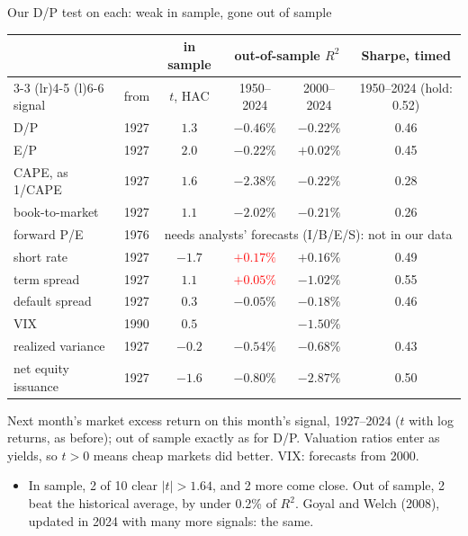 \documentclass[aspectratio=169,10pt]{beamer}
\begin{document}
\begin{frame}{Our D/P test on each: weak in sample, gone out of sample}
\begin{center}
\footnotesize
\renewcommand{\arraystretch}{1.0}
\begin{tabular}{@{}llcccc@{}}
\toprule
 & & in sample & \multicolumn{2}{c}{out-of-sample $R^{2}$} & Sharpe, timed \\
\cmidrule(lr){3-3} \cmidrule(lr){4-5} \cmidrule(l){6-6}
signal & from & $t$, HAC & 1950--2024 & 2000--2024 & 1950--2024 (hold: 0.52) \\
\midrule
D/P & 1927 & $1.3$ & $-0.46\%$ & $-0.22\%$ & 0.46 \\
E/P & 1927 & $2.0$ & $-0.22\%$ & $+0.02\%$ & 0.45 \\
CAPE, as 1/CAPE & 1927 & $1.6$ & $-2.38\%$ & $-0.22\%$ & 0.28 \\
book-to-market & 1927 & $1.1$ & $-2.02\%$ & $-0.21\%$ & 0.26 \\
forward P/E & 1976 & \multicolumn{4}{c}{needs analysts' forecasts (I/B/E/S): not in our data} \\
\midrule
short rate & 1927 & $-1.7$ & \textcolor{red}{$+0.17\%$} & $+0.16\%$ & 0.49 \\
term spread & 1927 & $1.1$ & \textcolor{red}{$+0.05\%$} & $-1.02\%$ & 0.55 \\
default spread & 1927 & $0.3$ & $-0.05\%$ & $-0.18\%$ & 0.46 \\
\midrule
VIX & 1990 & $0.5$ & & $-1.50\%$ & \\
realized variance & 1927 & $-0.2$ & $-0.54\%$ & $-0.68\%$ & 0.43 \\
net equity issuance & 1927 & $-1.6$ & $-0.80\%$ & $-2.87\%$ & 0.50 \\
\bottomrule
\end{tabular}
\end{center}
\vskip -2pt
{\scriptsize Next month's market excess return on this month's signal, 1927--2024 ($t$ with log returns, as before); out of sample exactly as for D/P. Valuation ratios enter as yields, so $t > 0$ means cheap markets did better. VIX: forecasts from 2000.\par}
\vskip 4pt
\begin{itemize}
\item In sample, 2 of 10 clear $|t| > 1.64$, and 2 more come close. Out of sample, 2 beat the historical average, by under 0.2\% of $R^{2}$. Goyal and Welch (2008), updated in 2024 with many more signals: the same.
\end{itemize}
\end{frame}
\end{document}
